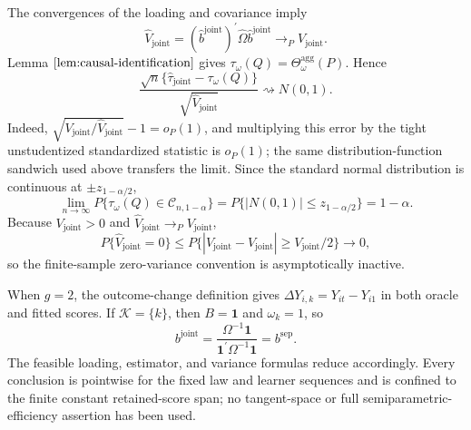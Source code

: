 The convergences of the loading and covariance imply
\[
 \widehat V_{\mathrm{joint}}
 =(\widehat b^{\mathrm{joint}})^{\prime}
  \widehat\Omega\widehat b^{\mathrm{joint}}
 \to_PV_{\mathrm{joint}}.
\]
Lemma \(\ref{lem:causal-identification}\) gives \(\tau_\omega(Q)=\Theta_\omega^{\mathrm{agg}}(P)\). Hence
\[
 \frac{\sqrt n\{\widehat\tau_{\mathrm{joint}}-\tau_\omega(Q)\}}
      {\sqrt{\widehat V_{\mathrm{joint}}}}
 \rightsquigarrow N(0,1).
\]
Indeed, \(\sqrt{V_{\mathrm{joint}}/\widehat V_{\mathrm{joint}}}-1=o_P(1)\), and multiplying this error by the tight unstudentized standardized statistic is \(o_P(1)\); the same distribution-function sandwich used above transfers the limit. Since the standard normal distribution is continuous at \(\pm z_{1-\alpha/2}\),
\[
 \lim_{n\to\infty}P\{\tau_\omega(Q)\in\mathcal C_{n,1-\alpha}\}
 =P\{|N(0,1)|\le z_{1-\alpha/2}\}=1-\alpha.
\]
Because \(V_{\mathrm{joint}}>0\) and \(\widehat V_{\mathrm{joint}}\to_PV_{\mathrm{joint}}\),
\[
 P\{\widehat V_{\mathrm{joint}}=0\}
 \le P\{|\widehat V_{\mathrm{joint}}-V_{\mathrm{joint}}|\ge V_{\mathrm{joint}}/2\}
 \longrightarrow0,
\]
so the finite-sample zero-variance convention is asymptotically inactive.

When \(g=2\), the outcome-change definition gives \(\Delta Y_{i,k}=Y_{it}-Y_{i1}\) in both oracle and fitted scores. If \(\mathcal K=\{k\}\), then \(B=\mathbf 1\) and \(\omega_k=1\), so
\[
 b^{\mathrm{joint}}
 =\frac{\Omega^{-1}\mathbf 1}{\mathbf 1^{\prime}\Omega^{-1}\mathbf 1}
 =b^{\mathrm{sep}}.
\]
The feasible loading, estimator, and variance formulas reduce accordingly. Every conclusion is pointwise for the fixed law and learner sequences and is confined to the finite constant retained-score span; no tangent-space or full semiparametric-efficiency assertion has been used.